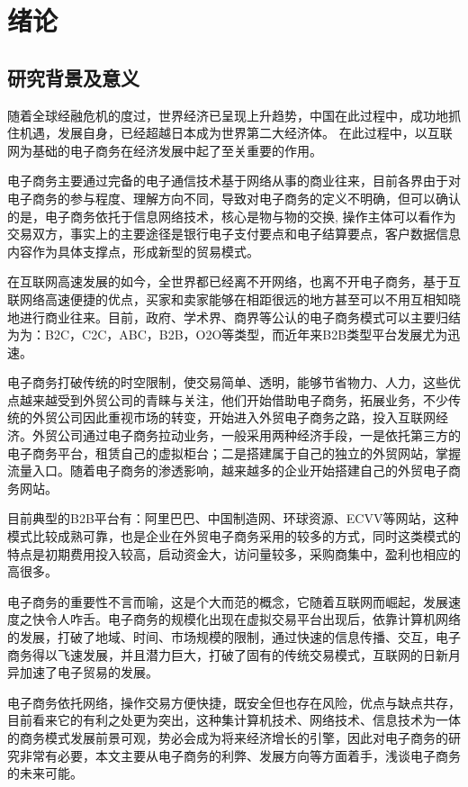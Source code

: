 \chapter{绪论}
\section{研究背景及意义}

随着全球经融危机的度过，世界经济已呈现上升趋势，中国在此过程中，成功地抓住机遇，发展自身，已经超越日本成为世界第二大经济体。
在此过程中，以互联网为基础的电子商务在经济发展中起了至关重要的作用。

电子商务主要通过完备的电子通信技术基于网络从事的商业往来，目前各界由于对电子商务的参与程度、理解方向不同，导致对电子商务的定义不明确，但可以确认的是，电子商务依托于信息网络技术，核心是物与物的交换,
操作主体可以看作为交易双方，事实上的主要途径是银行电子支付要点和电子结算要点，客户数据信息内容作为具体支撑点，形成新型的贸易模式。

在互联网高速发展的如今，全世界都已经离不开网络，也离不开电子商务，基于互联网络高速便捷的优点，买家和卖家能够在相距很远的地方甚至可以不用互相知晓地进行商业往来。目前，政府、学术界、商界等公认的电子商务模式可以主要归结为为：B2C，C2C，ABC，B2B，O2O等类型，而近年来B2B类型平台发展尤为迅速。

电子商务打破传统的时空限制，使交易简单、透明，能够节省物力、人力，这些优点越来越受到外贸公司的青睐与关注，他们开始借助电子商务，拓展业务，不少传统的外贸公司因此重视市场的转变，开始进入外贸电子商务之路，投入互联网经济。外贸公司通过电子商务拉动业务，一般采用两种经济手段，一是依托第三方的电子商务平台，租赁自己的虚拟柜台；二是搭建属于自己的独立的外贸网站，掌握流量入口。随着电子商务的渗透影响，越来越多的企业开始搭建自己的外贸电子商务网站。

目前典型的B2B平台有：阿里巴巴、中国制造网、环球资源、ECVV等网站，这种模式比较成熟可靠，也是企业在外贸电子商务采用的较多的方式，同时这类模式的特点是初期费用投入较高，启动资金大，访问量较多，采购商集中，盈利也相应的高很多。

电子商务的重要性不言而喻，这是个大而范的概念，它随着互联网而崛起，发展速度之快令人咋舌。电子商务的规模化出现在虚拟交易平台出现后，依靠计算机网络的发展，打破了地域、时间、市场规模的限制，通过快速的信息传播、交互，电子商务得以飞速发展，并且潜力巨大，打破了固有的传统交易模式，互联网的日新月异加速了电子贸易的发展。

电子商务依托网络，操作交易方便快捷，既安全但也存在风险，优点与缺点共存，目前看来它的有利之处更为突出，这种集计算机技术、网络技术、信息技术为一体的商务模式发展前景可观，势必会成为将来经济增长的引擎，因此对电子商务的研究非常有必要，本文主要从电子商务的利弊、发展方向等方面着手，浅谈电子商务的未来可能。

